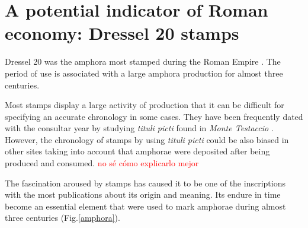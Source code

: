 \documentclass[review]{elsarticle}
\newcommand{\memo}[2]{\textcolor{#1}{#2}}
\newcommand{\maria}[1]{\memo{red}{#1\\}}
\newcommand{\xavi}[1]{\memo{magenta}{XRC: #1\\}}
\begin{document}


 

\section{A potential indicator of Roman economy: Dressel 20 stamps}

Dressel 20 was the amphora most stamped during the Roman Empire \citep[18]{millet_anforas_1998}. The  period of use is associated with a large amphora production for almost three centuries. 

Most stamps display a large activity of production that it can be difficult for specifying an accurate chronology in some cases. They have been frequently dated with the consultar year by studying \textit{tituli picti} found in \textit{Monte Testaccio} \citep{Testaccio1, berni_millet_epigrafianforica_2008}.
However, the chronology of stamps by using \textit{tituli picti} could be also biased in other sites taking into account that amphorae were deposited after being produced and consumed.  
\maria{no sé cómo explicarlo mejor} 

The fascination aroused by stamps has caused it to be one of the inscriptions with the most publications about its origin and meaning. Its endure in time become an essential element that were used to mark amphorae during almost three centuries \citep{remesal_sellar_2016} (Fig.\ref{amphora}). 
\end{document}
